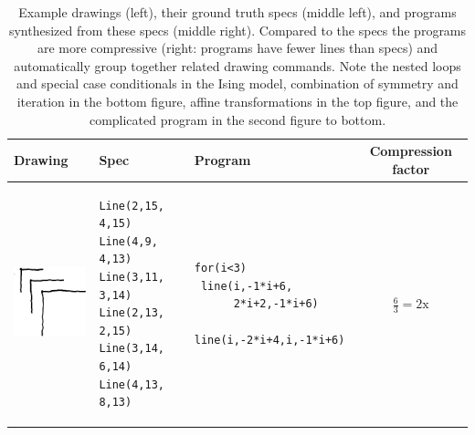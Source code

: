 \documentclass{article}
\theoremstyle{definition}
\begin{document}
\begin{table}[t]
  \caption{Example drawings (left), their ground truth specs (middle left), and programs synthesized from these specs (middle right). Compared to the specs the programs are more compressive (right: programs have fewer lines than specs) and automatically group together related drawing commands. Note the nested loops  and special case conditionals in the Ising model, combination of symmetry and iteration in the bottom figure,  affine transformations in the top figure, and the complicated program in the second figure to bottom.}\label{exampleSynthesisResults}
\centering  \begin{tabular}{m{1.5cm}llc}
    \toprule
    \textbf{Drawing}&\textbf{Spec}&\textbf{Program}&%
      \textbf{Compression factor}%
      \\
    \midrule
    \includegraphics[width = \exampleDrawingSize]{figures/expert-29-trim.png}&
\begin{minipage}{\exampleTraceSize}\begin{lstlisting}
Line(2,15, 4,15)
Line(4,9, 4,13)
Line(3,11, 3,14)
Line(2,13, 2,15)
Line(3,14, 6,14)
Line(4,13, 8,13)
\end{lstlisting}
\end{minipage}&     \begin{minipage}{\exampleProgramSize} \begin{lstlisting}
for(i<3)
 line(i,-1*i+6,
      2*i+2,-1*i+6)
 line(i,-2*i+4,i,-1*i+6)
       \end{lstlisting}
     \end{minipage}&$\frac{6}{3} = 2\text{x}$\\\midrule

\end{tabular}
\end{table}
\end{document}
